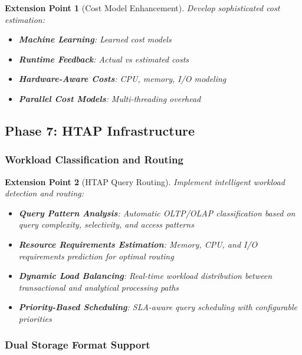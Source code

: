 \documentclass[12pt,a4paper]{article}
\newtheorem{extension}{Extension Point}[section]
\begin{document}
    \begin{extension}[Cost Model Enhancement]
        Develop sophisticated cost estimation:

        \begin{itemize}
            \item \textbf{Machine Learning}: Learned cost models
            \item \textbf{Runtime Feedback}: Actual vs estimated costs
            \item \textbf{Hardware-Aware Costs}: CPU, memory, I/O modeling
            \item \textbf{Parallel Cost Models}: Multi-threading overhead
        \end{itemize}
    \end{extension}

    \subsection{Phase 7: HTAP Infrastructure}

    \subsubsection{Workload Classification and Routing}

    \begin{extension}[HTAP Query Routing]
        Implement intelligent workload detection and routing:

        \begin{itemize}
            \item \textbf{Query Pattern Analysis}: Automatic OLTP/OLAP classification based on query complexity, selectivity, and access patterns
            \item \textbf{Resource Requirements Estimation}: Memory, CPU, and I/O requirements prediction for optimal routing
            \item \textbf{Dynamic Load Balancing}: Real-time workload distribution between transactional and analytical processing paths
            \item \textbf{Priority-Based Scheduling}: SLA-aware query scheduling with configurable priorities
        \end{itemize}
    \end{extension}

    \subsubsection{Dual Storage Format Support}
\end{document}

